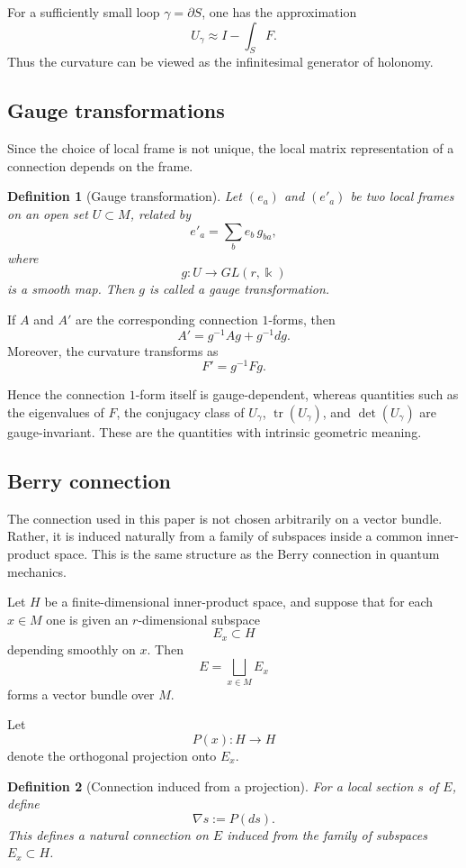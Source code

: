\documentclass[pdflatex,sn-mathphys-num]{sn-jnl}%
\theoremstyle{thmstyleone}%
\theoremstyle{thmstyletwo}%
\theoremstyle{thmstylethree}%
\newtheorem{definition}{Definition}%
\begin{document}
\begin{appendices}
For a sufficiently small loop $\gamma=\partial S$, one has the approximation
\[
U_\gamma \approx I-\int_S F.
\]
Thus the curvature can be viewed as the infinitesimal generator of holonomy.

\subsection{Gauge transformations}

Since the choice of local frame is not unique, the local matrix representation of a connection depends on the frame.

\begin{definition}[Gauge transformation]
Let $(e_a)$ and $(e'_a)$ be two local frames on an open set $U\subset M$, related by
\[
e'_a=\sum_b e_b\, g_{ba},
\]
where
\[
g:U\to GL(r,\Bbbk)
\]
is a smooth map. Then $g$ is called a gauge transformation.
\end{definition}

If $A$ and $A'$ are the corresponding connection $1$-forms, then
\[
A'=g^{-1}Ag+g^{-1}dg.
\]
Moreover, the curvature transforms as
\[
F'=g^{-1}Fg.
\]

Hence the connection $1$-form itself is gauge-dependent, whereas quantities such as the eigenvalues of $F$, the conjugacy class of $U_\gamma$, $\operatorname{tr}(U_\gamma)$, and $\det(U_\gamma)$ are gauge-invariant. These are the quantities with intrinsic geometric meaning.

\subsection{Berry connection}

The connection used in this paper is not chosen arbitrarily on a vector bundle. Rather, it is induced naturally from a family of subspaces inside a common inner-product space. This is the same structure as the Berry connection in quantum mechanics.

Let $H$ be a finite-dimensional inner-product space, and suppose that for each $x\in M$ one is given an $r$-dimensional subspace
\[
E_x\subset H
\]
depending smoothly on $x$. Then
\[
E=\bigsqcup_{x\in M} E_x
\]
forms a vector bundle over $M$.

Let
\[
P(x):H\to H
\]
denote the orthogonal projection onto $E_x$.

\begin{definition}[Connection induced from a projection]
For a local section $s$ of $E$, define
\[
\nabla s:=P(ds).
\]
This defines a natural connection on $E$ induced from the family of subspaces $E_x\subset H$.
\end{definition}


\end{appendices}
\end{document}
